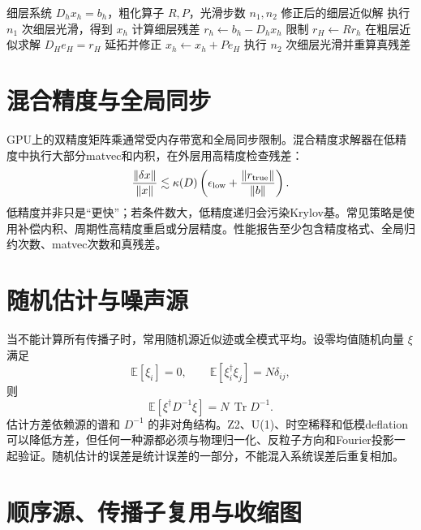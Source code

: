 \documentclass[UTF8,12pt,a4paper,twoside,openany]{ctexbook}
\newcommand{\Tr}{\operatorname{Tr}}
\begin{document}
\begin{algorithm}[htbp]
\caption{两层multigrid V-cycle的概念结构。}
\label{alg:multigrid}
\begin{algorithmic}[1]
\Require 细层系统 \(D_hx_h=b_h\)，粗化算子 \(R,P\)，光滑步数 \(n_1,n_2\)
\Ensure 修正后的细层近似解
\State 执行 \(n_1\) 次细层光滑，得到 \(x_h\)
\State 计算细层残差 \(r_h\gets b_h-D_hx_h\)
\State 限制 \(r_H\gets Rr_h\)
\State 在粗层近似求解 \(D_He_H=r_H\)
\State 延拓并修正 \(x_h\gets x_h+Pe_H\)
\State 执行 \(n_2\) 次细层光滑并重算真残差
\end{algorithmic}
\end{algorithm}

\section{混合精度与全局同步}

GPU上的双精度矩阵乘通常受内存带宽和全局同步限制。混合精度求解器在低精度中执行大部分matvec和内积，在外层用高精度检查残差：
\begin{equation}
  \frac{\|\delta x\|}{\|x\|}
  \lesssim\kappa(D)\left(\epsilon_{\rm low}+
  \frac{\|r_{\rm true}\|}{\|b\|}\right).
  \label{eq:mixed-precision-bound}
\end{equation}
低精度并非只是“更快”；若条件数大，低精度递归会污染Krylov基。常见策略是使用补偿内积、周期性高精度重启或分层精度。性能报告至少包含精度格式、全局归约次数、matvec次数和真残差。

\section{随机估计与噪声源}

当不能计算所有传播子时，常用随机源近似迹或全模式平均。设零均值随机向量 \(\xi\) 满足
\begin{equation}
  \mathbb E[\xi_i]=0,
  \qquad
  \mathbb E[\xi_i^\dagger\xi_j]=N\delta_{ij},
  \label{eq:random-source}
\end{equation}
则
\begin{equation}
  \mathbb E[\xi^\dagger D^{-1}\xi]
  =N\,\Tr D^{-1}.
  \label{eq:random-trace}
\end{equation}
估计方差依赖源的谱和 \(D^{-1}\) 的非对角结构。Z2、U(1)、时空稀释和低模deflation可以降低方差，但任何一种源都必须与物理归一化、反粒子方向和Fourier投影一起验证。随机估计的误差是统计误差的一部分，不能混入系统误差后重复相加。

\section{顺序源、传播子复用与收缩图}
\end{document}
